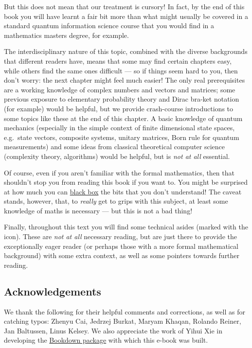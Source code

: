 \documentclass[fleqn]{article}
\begin{document}
But this does not mean that our treatment is cursory!
In fact, by the end of this book you will have learnt a fair bit more than what might usually be covered in a standard quantum information science course that you would find in a mathematics masters degree, for example.

The interdisciplinary nature of this topic, combined with the diverse backgrounds that different readers have, means that some may find certain chapters easy, while others find the same ones difficult --- so if things seem hard to you, then don't worry: the next chapter might feel much easier!
The only real prerequisites are a working knowledge of complex numbers and vectors and matrices; some previous exposure to elementary probability theory and Dirac bra-ket notation (for example) would be helpful, but we provide crash-course introductions to some topics like these at the end of this chapter.
A basic knowledge of quantum mechanics (especially in the simple context of finite dimensional state spaces, e.g.~state vectors, composite systems, unitary matrices, Born rule for quantum measurements) and some ideas from classical theoretical computer science (complexity theory, algorithms) would be helpful, but is \emph{not at all} essential.

Of course, even if you aren't familiar with the formal mathematics, then that shouldn't stop you from reading this book if you want to.
You might be surprised at how much you can \href{https://en.wikipedia.org/wiki/Black_box}{black box} the bits that you don't understand!
The caveat stands, however, that, to \emph{really} get to grips with this subject, at least some knowledge of maths is necessary --- but this is not a bad thing!

Finally, throughout this text you will find some technical asides (marked with the icon).
These are \emph{not at all} necessary reading, but are just there to provide the exceptionally eager reader (or perhaps those with a more formal mathematical background) with some extra context, as well as some pointers towards further reading.

\hypertarget{acknowledgements}{%
\subsection*{Acknowledgements}\label{acknowledgements}}

We thank the following for their helpful comments and corrections, as well as for catching typos: Zhenyu Cai, Jedrzej Burkat, Maryam Khaqan, Rolando Reiner, Jan Baltussen, Linus Kelsey.
We also appreciate the work of Yihui Xie in developing the \href{https://bookdown.org/yihui/bookdown/}{Bookdown package} with which this e-book was built.
\end{document}
